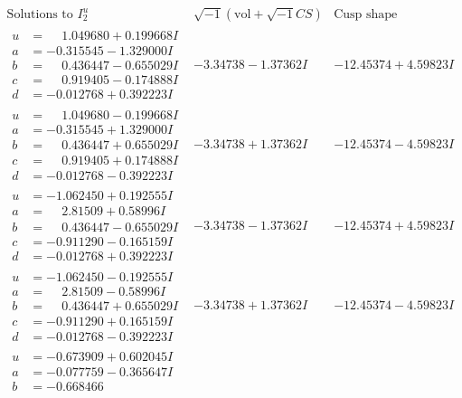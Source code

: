 \documentclass[1p]{elsarticle_modified}
\theoremstyle{definition}
\newcommand{\I}{\sqrt{-1}}
\begin{document}
$$\begin{array}{c|c|c}  
\text{Solutions to }I^u_{2}& \I (\text{vol} + \sqrt{-1}CS) & \text{Cusp shape}\\
 \hline 
\begin{aligned}
u &= \phantom{-}1.049680 + 0.199668 I \\
a &= -0.315545 - 1.329000 I \\
b &= \phantom{-}0.436447 - 0.655029 I \\
c &= \phantom{-}0.919405 - 0.174888 I \\
d &= -0.012768 + 0.392223 I\end{aligned}
 & -3.34738 - 1.37362 I & -12.45374 + 4.59823 I \\ \hline\begin{aligned}
u &= \phantom{-}1.049680 - 0.199668 I \\
a &= -0.315545 + 1.329000 I \\
b &= \phantom{-}0.436447 + 0.655029 I \\
c &= \phantom{-}0.919405 + 0.174888 I \\
d &= -0.012768 - 0.392223 I\end{aligned}
 & -3.34738 + 1.37362 I & -12.45374 - 4.59823 I \\ \hline\begin{aligned}
u &= -1.062450 + 0.192555 I \\
a &= \phantom{-}2.81509 + 0.58996 I \\
b &= \phantom{-}0.436447 - 0.655029 I \\
c &= -0.911290 - 0.165159 I \\
d &= -0.012768 + 0.392223 I\end{aligned}
 & -3.34738 - 1.37362 I & -12.45374 + 4.59823 I \\ \hline\begin{aligned}
u &= -1.062450 - 0.192555 I \\
a &= \phantom{-}2.81509 - 0.58996 I \\
b &= \phantom{-}0.436447 + 0.655029 I \\
c &= -0.911290 + 0.165159 I \\
d &= -0.012768 - 0.392223 I\end{aligned}
 & -3.34738 + 1.37362 I & -12.45374 - 4.59823 I \\ \hline\begin{aligned}
u &= -0.673909 + 0.602045 I \\
a &= -0.077759 - 0.365647 I \\
b &= -0.668466\phantom{ +0.000000I} \\

\end{aligned}
\end{array}$$
\end{document}
